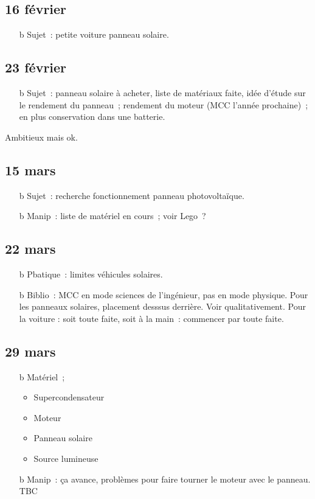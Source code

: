 \documentclass[a4paper, 11pt, final, garamond]{book}
\begin{document}
\subsection{16 février}
\begin{itemize}
	\item[b]{Sujet}~: petite voiture panneau solaire.
\end{itemize}

\subsection{23 février}
\begin{itemize}
	\item[b]{Sujet}~: panneau solaire à acheter, liste de matériaux faite, idée
	d'étude sur le rendement du panneau~; rendement du moteur (MCC l'année
	prochaine)~; en plus conservation dans une batterie.
\end{itemize}

Ambitieux mais ok.

\subsection{15 mars}
\begin{itemize}
	\item[b]{Sujet}~: recherche fonctionnement panneau photovoltaïque.
	\item[b]{Manip}~: liste de matériel en cours~; voir Lego~?
\end{itemize}

\subsection{22 mars}
\begin{itemize}
	\item[b]{Pbatique}~: limites véhicules solaires.
	\item[b]{Biblio}~: MCC en mode sciences de l'ingénieur, pas en mode physique.
	Pour les panneaux solaires, placement desssus derrière. Voir qualitativement.
	Pour la voiture : soit toute faite, soit à la main~: commencer par toute
	faite.
\end{itemize}

\subsection{29 mars}
\begin{itemize}
	\item[b]{Matériel}~;
	\begin{itemize}[label=\iconchek]
		\item Supercondensateur
		\item Moteur
		\item Panneau solaire
		\item Source lumineuse
	\end{itemize}
	\item[b]{Manip}~: ça avance, problèmes pour faire tourner le moteur avec le
	panneau. TBC
\end{itemize}
\end{document}
